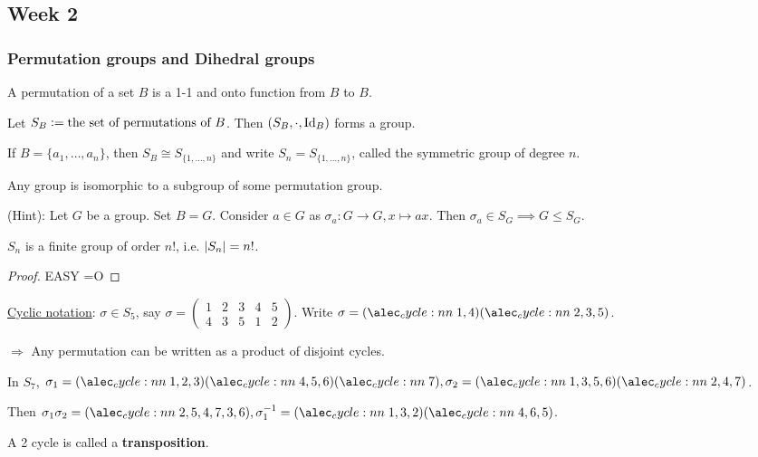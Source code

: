 \subsection{Week 2}
\subsubsection{Permutation groups and Dihedral groups}
\begin{definition}
  A permutation of a set $B$ is a 1-1 and onto function from $B$ to $B$.

  Let $S_B \vcentcolon= \text{the set of permutations of $B$}$. Then
  $(S_B, \cdot, {\rm Id}_B)$ forms a group.

  If $B = \{a_1, \dots, a_n\}$, then $S_B \cong S_{\{1,\dots,n\}}$ and write
  $S_n = S_{\{1,\dots,n\}}$, called the symmetric group of degree $n$.
\end{definition}

\begin{theorem}
  Any group is isomorphic to a subgroup of some permutation group.
  
  (Hint): Let $G$ be a group. Set $B = G$. Consider $a \in G$ as
  $\sigma_a: G \to G, x \mapsto ax$.
  Then $\sigma_a \in S_G \implies G \le S_G$.
\end{theorem}

\begin{fact}
  $S_n$ is a finite group of order $n!$, i.e. $\lvert S_n\rvert = n!$.
  \begin{proof}
    EASY =O
  \end{proof}
\end{fact}

\underline{Cyclic notation}: $\sigma \in S_5$, say $\sigma = \begin{pmatrix}
  1 & 2 & 3 & 4 & 5 \\
  4 & 3 & 5 & 1 & 2
\end{pmatrix}$.
Write $\sigma = \cycle{1, 4}\cycle{2, 3, 5}$.

$\Rightarrow$ Any permutation can be written as a product of disjoint cycles.

\begin{example}
  In $S_7$, $\sigma_1 = \cycle{1,2,3}\cycle{4,5,6}\cycle{7},
  \sigma_2 = \cycle{1,3,5,6}\cycle{2,4,7}$.

  Then $\sigma_1\sigma_2 = \cycle{2,5,4,7,3,6},
  \sigma_1^{-1} = \cycle{1,3,2}\cycle{4,6,5}$.
\end{example}

\begin{definition}
  A 2 cycle is called a {\bf transposition}.
\end{definition}

